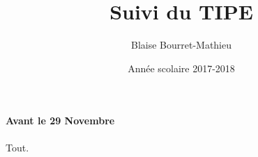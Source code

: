 \documentclass{article}
\title{Suivi du TIPE}
\author{Blaise Bourret-Mathieu}
\date{Année scolaire 2017-2018}
\begin{document}
\paragraph*{Avant le 29 Novembre}
Tout.
\end{document}
